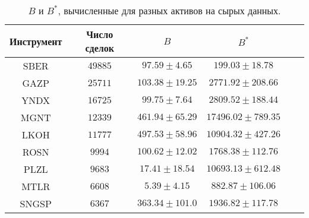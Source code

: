 \begin{table}[h!]
    \begin{center}
        \begin{tabular}{|c|c|c|c|c|c|}
            \hline
            Инструмент        & Число сделок  & $B$ & $B ^*$ \\ \hline
            SBER & $49885$ & $97.59 \pm 4.65$ & $199.03 \pm 18.78$ \\ \hline 
            GAZP & $25711$ & $103.38 \pm 19.25$ & $2771.92 \pm 208.66$ \\ \hline 
            YNDX & $16725$ & $99.75 \pm 7.64$ & $2809.52 \pm 188.44$ \\ \hline 
            MGNT & $12339$ & $461.94 \pm 65.29$ & $17496.02 \pm 789.35$ \\ \hline 
            LKOH & $11777$ & $497.53 \pm 58.96$ & $10904.32 \pm 427.26$ \\ \hline 
            ROSN & $9994$ & $100.62 \pm 12.02$ & $1768.38 \pm 112.76$ \\ \hline 
            PLZL & $9683$ & $17.41 \pm 18.54$ & $10693.13 \pm 612.48$ \\ \hline 
            MTLR & $6608$ & $5.39 \pm 4.15$ & $882.87 \pm 106.06$ \\ \hline 
            SNGSP & $6367$ & $363.34 \pm 101.0$ & $1936.82 \pm 117.78$ \\ \hline 

        \end{tabular}
    \end{center}
    \label{RD_SE_1}
    \caption{$B$ и $B ^*$, вычисленные для разных активов на сырых данных.}
    \end{table} 

